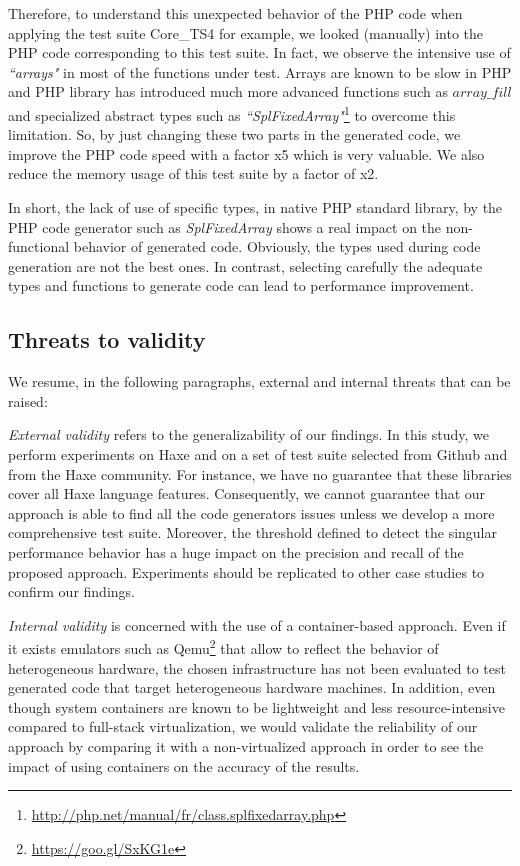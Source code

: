 Therefore, to understand this unexpected behavior of the PHP code when applying the test suite Core\_TS4 for example, we looked (manually) into the PHP code corresponding to this test suite. In fact, we observe the intensive use of \textit{``arrays"} in most of the functions under test. Arrays are known to be slow in PHP and PHP library has introduced much more advanced functions such as $array\_fill$ and specialized abstract types such as \textit{``SplFixedArray"}\footnote{\url{http://php.net/manual/fr/class.splfixedarray.php}} to overcome this limitation. So, by just changing these two parts in the generated code, we improve the PHP code speed with a factor x5 which is very valuable. We also reduce the memory usage of this test suite by a factor of x2.

In short, the lack of use of specific types, in native PHP standard library, by the PHP code generator such as \textit{SplFixedArray} shows a real impact on the non-functional behavior of generated code. Obviously, the types used during code generation are not the best ones. In contrast, selecting carefully the adequate types and functions to generate code can lead to performance improvement. 

\subsection{Threats to validity}
We resume, in the following paragraphs, external and internal threats that can be raised:

\textit{External validity} refers to the generalizability of our findings. In this study, we perform experiments on Haxe and on a set of test suite selected from Github and from the Haxe community. For instance, we have no guarantee that these libraries cover all Haxe language features. Consequently, we cannot guarantee that our approach is able to find all the code generators issues unless we develop a more comprehensive test suite. Moreover, the threshold defined to detect the singular performance behavior has a huge impact on the precision and recall of the proposed approach. Experiments should be replicated to other case studies to confirm our findings.

\textit{Internal validity} is concerned with the use of a container-based approach. Even if it exists emulators such as Qemu\footnote{\url{https://goo.gl/SxKG1e}} that allow to reflect the behavior of heterogeneous hardware, the chosen infrastructure has not been evaluated to test generated code that target heterogeneous hardware machines. In addition, even though system containers are known to be lightweight and less resource-intensive compared to full-stack virtualization, we would validate the reliability of our approach by comparing it with a non-virtualized approach in order to see the impact of using containers on the accuracy of the results.



